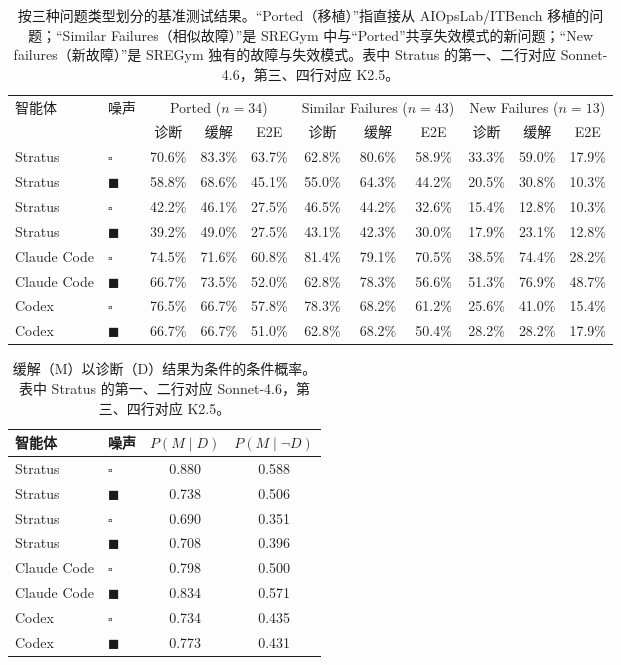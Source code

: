 \documentclass[11pt,UTF8,fontset=fandol]{ctexart}
\begin{document}
\begin{table}[H]\centering
\caption{按三种问题类型划分的基准测试结果。“Ported（移植）”指直接从 AIOpsLab/ITBench 移植的问题；“Similar Failures（相似故障）”是 SREGym 中与“Ported”共享失效模式的新问题；“New failures（新故障）”是 SREGym 独有的故障与失效模式。表中 Stratus 的第一、二行对应 Sonnet-4.6，第三、四行对应 K2.5。}
\label{tab:4}
\setlength{\tabcolsep}{3.5pt}
\begin{tabular}{llccccccccc}
\toprule
\multirow{2}{*}{智能体} & \multirow{2}{*}{噪声} & \multicolumn{3}{c}{Ported ($n=34$)} & \multicolumn{3}{c}{Similar Failures ($n=43$)} & \multicolumn{3}{c}{New Failures ($n=13$)} \\
\cmidrule(lr){3-5}\cmidrule(lr){6-8}\cmidrule(lr){9-11}
 & & 诊断 & 缓解 & E2E & 诊断 & 缓解 & E2E & 诊断 & 缓解 & E2E \\
\midrule
Stratus & $\square$ & 70.6\% & 83.3\% & 63.7\% & 62.8\% & 80.6\% & 58.9\% & 33.3\% & 59.0\% & 17.9\% \\
Stratus & $\blacksquare$ & 58.8\% & 68.6\% & 45.1\% & 55.0\% & 64.3\% & 44.2\% & 20.5\% & 30.8\% & 10.3\% \\
Stratus & $\square$ & 42.2\% & 46.1\% & 27.5\% & 46.5\% & 44.2\% & 32.6\% & 15.4\% & 12.8\% & 10.3\% \\
Stratus & $\blacksquare$ & 39.2\% & 49.0\% & 27.5\% & 43.1\% & 42.3\% & 30.0\% & 17.9\% & 23.1\% & 12.8\% \\
Claude Code & $\square$ & 74.5\% & 71.6\% & 60.8\% & 81.4\% & 79.1\% & 70.5\% & 38.5\% & 74.4\% & 28.2\% \\
Claude Code & $\blacksquare$ & 66.7\% & 73.5\% & 52.0\% & 62.8\% & 78.3\% & 56.6\% & 51.3\% & 76.9\% & 48.7\% \\
Codex & $\square$ & 76.5\% & 66.7\% & 57.8\% & 78.3\% & 68.2\% & 61.2\% & 25.6\% & 41.0\% & 15.4\% \\
Codex & $\blacksquare$ & 66.7\% & 66.7\% & 51.0\% & 62.8\% & 68.2\% & 50.4\% & 28.2\% & 28.2\% & 17.9\% \\
\bottomrule
\end{tabular}
\end{table}

\begin{table}[H]\centering
\caption{缓解（M）以诊断（D）结果为条件的条件概率。表中 Stratus 的第一、二行对应 Sonnet-4.6，第三、四行对应 K2.5。}
\label{tab:5}
\begin{tabular}{llcc}
\toprule
智能体 & 噪声 & $P(M\mid D)$ & $P(M\mid \neg D)$ \\
\midrule
Stratus & $\square$ & 0.880 & 0.588 \\
Stratus & $\blacksquare$ & 0.738 & 0.506 \\
Stratus & $\square$ & 0.690 & 0.351 \\
Stratus & $\blacksquare$ & 0.708 & 0.396 \\
Claude Code & $\square$ & 0.798 & 0.500 \\
Claude Code & $\blacksquare$ & 0.834 & 0.571 \\
Codex & $\square$ & 0.734 & 0.435 \\
Codex & $\blacksquare$ & 0.773 & 0.431 \\
\bottomrule
\end{tabular}
\end{table}
\end{document}
